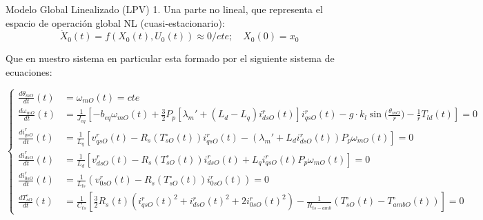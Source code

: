 \documentclass[12pt]{beamer}
\begin{document}
\begin{frame}{Modelo Global Linealizado (LPV)}\tiny
1. Una parte no lineal, que representa el espacio de operación global NL (cuasi-estacionario):
  \begin{equation}
  \dot{X}_0(t) = f(X_0(t),U_0(t)) \approx 0/ete; \quad X_0(0) = x_0
  \label{Ec.25}
  \end{equation}

Que en nuestro sistema en particular esta formado por el siguiente sistema de ecuaciones:

\begin{equation}
\left\{
\begin{aligned}
\frac{d\theta_{mO}}{dt}(t) &= \omega_{mO}(t) = cte \\
\frac{d\omega_{mO}}{dt}(t) &= \frac{1}{J_{eq}}\left[-b_{eq}\omega_{mO}(t) + \frac{3}{2}P_p[\lambda_m' + (L_d - L_q)i^r_{dsO}(t)]i^r_{qsO}(t) - g \cdot k_l \sin\Bigg(\frac{\theta_{mO}}{r}\Bigg) - \frac{1}{r} T_{ld}(t)\right] = 0 \\
\frac{di^r_{qsO}}{dt}(t) &= \frac{1}{L_q}\left[v^r_{qsO}(t) - R_s(T^\circ_{sO}(t))i^r_{qsO}(t) - (\lambda_m' + L_di^r_{dsO}(t))P_p\omega_{mO}(t)\right] = 0 \\
\frac{di^r_{dsO}}{dt}(t) &= \frac{1}{L_d}\left[v^r_{dsO}(t) - R_s(T^\circ_{sO}(t))i^r_{dsO}(t) + L_qi^r_{qsO}(t)P_p\omega_{mO}(t)\right] = 0 \\
\frac{di^r_{0sO}}{dt}(t) &= \frac{1}{L_{ls}}(v^r_{0sO}(t) - R_s(T^\circ_{sO}(t))i^r_{0sO}(t)) = 0 \\
\frac{dT^\circ_{sO}}{dt}(t) &= \frac{1}{C_{ts}}\left[\frac{3}{2}R_s(t)(i^r_{qsO}(t)^2 + i^r_{dsO}(t)^2 + 2i^r_{0sO}(t)^2) - \frac{1}{R_{ts-amb}}(T^\circ_{sO}(t) - T^\circ_{ambO}(t))\right] = 0 
\end{aligned}
\right.
\end{equation}
\end{frame}
\end{document}
